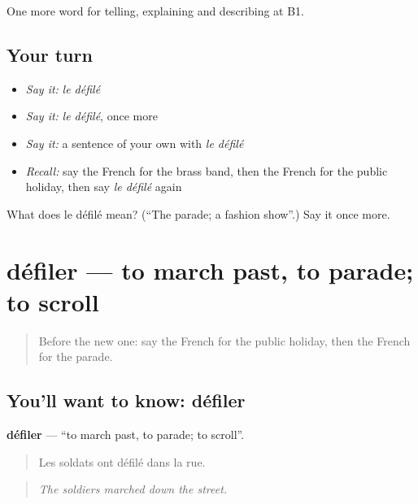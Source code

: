 \begin{grammarlens}[title={What you've built}]
One more word for telling, explaining and describing at B1.
\end{grammarlens}

\subsection*{Your turn}
\begin{itemize}
\raggedright
  \item \emph{Say it:} \emph{le défilé}
  \item \emph{Say it:} \emph{le défilé}, once more
  \item \emph{Say it:} a sentence of your own with \emph{le défilé}
  \item \emph{Recall:} say the French for the brass band, then the French for the public holiday, then say \emph{le défilé} again
\end{itemize}

\begin{tcolorbox}[breakable,colback=teal!4,colframe=teal!35!black,title={Before you move on}]
What does le défilé mean? (\textquotedblleft{}The parade; a fashion show\textquotedblright{}.) Say it once more.
\end{tcolorbox}
\section[défiler]{défiler — to march past, to parade; to scroll}

\label{lesson:FR-C317-defiler}



\begin{quote}
Before the new one: say the French for the public holiday, then the French for the parade.
\end{quote}

\subsection*{You'll want to know: défiler}
\textbf{défiler} — \textquotedblleft{}to march past, to parade; to scroll\textquotedblright{}.

\begin{quote}
Les soldats ont défilé dans la rue.
\end{quote}

\begin{quote}
\emph{The soldiers marched down the street.}
\end{quote}

